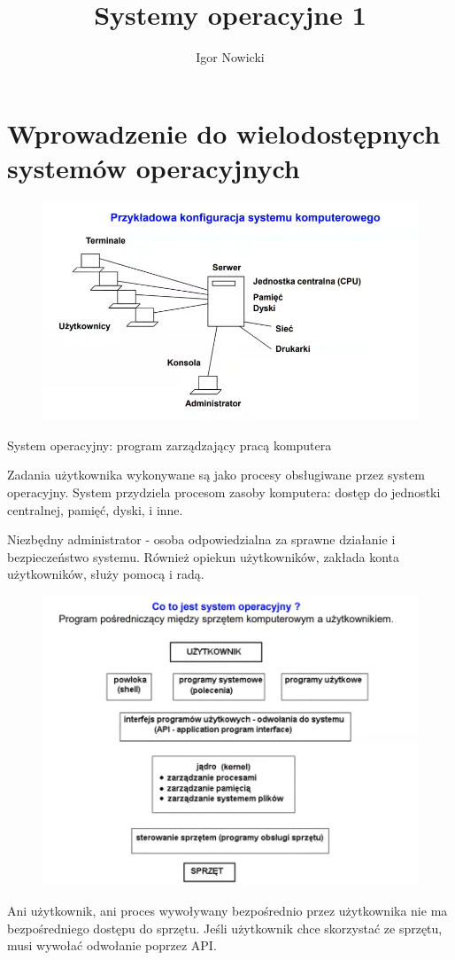 \documentclass[11pt]{article}
\title{Systemy operacyjne 1}
\author{Igor Nowicki}
\begin{document}
\maketitle
\tableofcontents

\section{Wprowadzenie do wielodostępnych systemów operacyjnych}

\begin{figure}[H]
    \centering
    \includegraphics[width=0.5\linewidth]{./img/so1-01.png}
\end{figure}

System operacyjny: program zarządzający pracą komputera

Zadania użytkownika wykonywane są jako procesy obsługiwane przez system
operacyjny. System przydziela procesom zasoby komputera: dostęp do jednostki
centralnej, pamięć, dyski, i inne.

Niezbędny administrator - osoba odpowiedzialna za sprawne działanie i bezpieczeństwo
systemu. Również opiekun użytkowników, zakłada konta użytkowników, służy pomocą i
radą.

\begin{figure}[H]
    \centering
    \includegraphics[width=0.5\linewidth]{./img/so1-02.png}
\end{figure}

Ani użytkownik, ani proces wywoływany bezpośrednio przez użytkownika nie ma bezpośredniego dostępu do sprzętu. Jeśli użytkownik chce skorzystać ze sprzętu, musi wywołać odwołanie poprzez API.
\end{document}

